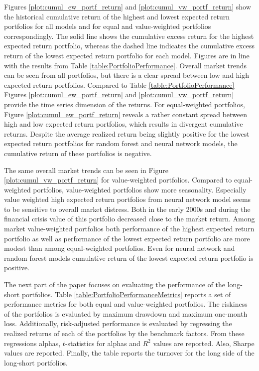 \documentclass[12pt]{article}
\begin{document}
Figures \ref{plot:cumul_ew_portf_return} and \ref{plot:cumul_vw_portf_return} show the historical cumulative return of the highest and lowest expected return portfolios for all models and for equal and value-weighted portfolios correspondingly. The solid line shows the cumulative excess return for the highest expected return portfolio, whereas the dashed line indicates the cumulative excess return of the lowest expected return portfolio for each model. Figures are in line with the results from Table \ref{table:PortfolioPerformance}. Overall market trends can be seen from all portfolios, but there is a clear spread between low and high expected return portfolios. Compared to Table \ref{table:PortfolioPerformance} Figures \ref{plot:cumul_ew_portf_return} and \ref{plot:cumul_vw_portf_return} provide the time series dimension of the returns. For equal-weighted portfolios, Figure \ref{plot:cumul_ew_portf_return} reveals a rather constant spread between high and low expected return portfolios, which results in divergent cumulative returns. Despite the average realized return being slightly positive for the lowest expected return portfolios for random forest and neural network models, the cumulative return of these portfolios is negative. \par

The same overall market trends can be seen in Figure \ref{plot:cumul_vw_portf_return} for value-weighted portfolios. Compared to equal-weighted portfolios, value-weighted portfolios show more seasonality. Especially value weighted high expected return portfolios from neural network model seems to be sensitive to overall market distress. Both in the early 2000s and during the financial crisis value of this portfolio decreased close to the market return. Among market value-weighted portfolios both performance of the highest expected return portfolio as well as performance of the lowest expected return portfolio are more modest than among equal-weighted portfolios. Even for neural network and random forest models cumulative return of the lowest expected return portfolio is positive. \par

The next part of the paper focuses on evaluating the performance of the long-short portfolios. Table \ref{table:PortfolioPerformanceMetrics} reports a set of performance metrics for both equal and value-weighted portfolios. The riskiness of the portfolios is evaluated by maximum drawdown and maximum one-month loss. Additionally, risk-adjusted performance is evaluated by regressing the realized returns of each of the portfolios by the benchmark factors. From these regressions alphas, $t$-statistics for alphas and $R^2$ values are reported. Also, Sharpe values are reported. Finally, the table reports the turnover for the long side of the long-short portfolios. \par
\end{document}
